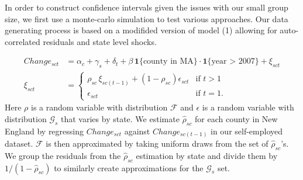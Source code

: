\documentclass[12pt]{article}
\begin{document}
In order to construct confidence intervals given the issues with our small group size, we first use a monte-carlo simulation to test various approaches. Our data generating process is based on a modifided version of model (1) allowing for auto-correlated residuals and state level shocks. 
\begin{comment}
\begin{align}
Change_{sct} & = \alpha_c + \gamma_s + \delta_t + \beta \, \mathbf{1}\{\text{county in MA}\} \cdot \mathbf{1}\{\text{year > 2007}\} + \xi_{sct} \\
\xi_{sct} & = 
\begin{cases}\rho_{sc} \, \xi_{sc(t-1)} + (1-\rho_{sc}) \epsilon_{sct} &\mbox{if } t > 1 \nonumber \\ 
\epsilon_{sct}  & \mbox{if } t = 1. \end{cases}\\
\epsilon_{sct} & = \mu_{st} + \upsilon_{sct}
\end{align}
Here $\rho$ is a random variable with distribution $\mathcal{F}$, $\mu$ is a random variable with distribution $\mathcal{G}$ and $\upsilon$ is a random variable with distribution $\mathcal{H}$. We estimate $\hat{\rho}_{sc}$ for each county in New England by regressing $Change_{sct}$ against $Change_{sc(t-1)}$ in our self-employed dataset. $\mathcal{F}$ is then approximated by taking uniform draws from the set of $\hat{\rho}_{sc}$'s. We group the residuals from the $\hat{\rho}_{sc}$ estimation by state and divide them by $1/(1-\hat{\rho}_{sc})$ to generate a set of $\hat{\epsilon}_{sct}$ values. We use the mean of $\hat{\epsilon}_{sct}$ values grouped by state and year to produce a set of $\hat{\mu}_{st}$ values that once standardized appropriate $\mathcal{G}$. Then $\hat{\epsilon}_{sct}$ minus the corresponding $\hat{\mu}_{st}$ values produce a set of $\hat{\upsilon}_{sct}$ draws that once standardized approximate $\mathcal{H}$.
\end{comment}
\begin{align}
Change_{sct} & = \alpha_c + \gamma_s + \delta_t + \beta \, \mathbf{1}\{\text{county in MA}\} \cdot \mathbf{1}\{\text{year > 2007}\} + \xi_{sct} \\
\xi_{sct} & = 
\begin{cases}\rho_{sc} \, \xi_{sc(t-1)} + (1-\rho_{sc}) \epsilon_{sct} &\mbox{if } t > 1 \nonumber \\ 
\epsilon_{sct}  & \mbox{if } t = 1. \end{cases}
\end{align}
Here $\rho$ is a random variable with distribution $\mathcal{F}$ and $\epsilon$ is a random variable with distribution $\mathcal{G}_s$ that varies by state. We estimate $\hat{\rho}_{sc}$ for each county in New England by regressing $Change_{sct}$ against $Change_{sc(t-1)}$ in our self-employed dataset. $\mathcal{F}$ is then approximated by taking uniform draws from the set of $\hat{\rho}_{sc}$'s. We group the residuals from the $\hat{\rho}_{sc}$ estimation by state and divide them by $1/(1-\hat{\rho}_{sc})$ to similarly create approximations for the $\mathcal{G}_s$ set. 
\end{document}

